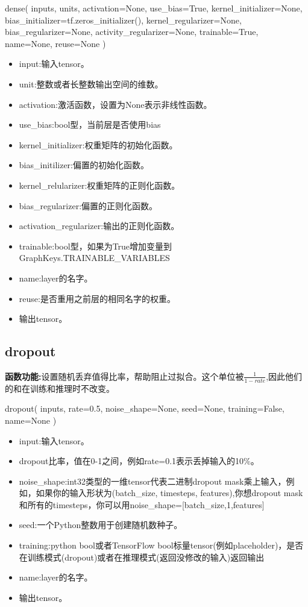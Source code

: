 \begin{python}
dense(
    inputs,
    units,
    activation=None,
    use_bias=True,
    kernel_initializer=None,
    bias_initializer=tf.zeros_initializer(),
    kernel_regularizer=None,
    bias_regularizer=None,
    activity_regularizer=None,
    trainable=True,
    name=None,
    reuse=None
)
\end{python}
\begin{itemize}
	\item input:输入tensor。
	\item unit:整数或者长整数输出空间的维数。
	\item activation:激活函数，设置为None表示非线性函数。
	\item use\_bias:bool型，当前层是否使用bias
	\item kernel\_initializer:权重矩阵的初始化函数。
	\item bias\_initilizer:偏置的初始化函数。
	\item kernel\_relularizer:权重矩阵的正则化函数。
	\item bias\_regularizer:偏置的正则化函数。
	\item activation\_regularizer:输出的正则化函数。
	\item trainable:bool型，如果为True增加变量到GraphKeys.TRAINABLE\_VARIABLES
	\item name:layer的名字。
	\item reuse:是否重用之前层的相同名字的权重。
	\item 输出tensor。
\end{itemize}
\subsection{dropout}
\textbf{函数功能:}设置随机丢弃值得比率，帮助阻止过拟合。这个单位被$\frac{1}{1-rate}$,因此他们的和在训练和推理时不改变。

\begin{python}
dropout(
    inputs,
    rate=0.5,
    noise_shape=None,
    seed=None,
    training=False,
    name=None
)
\end{python}
\begin{itemize}
	\item input:输入tensor。
	\item dropout比率，值在0-1之间，例如rate=0.1表示丢掉输入的10\%。
	\item noise\_shape:int32类型的一维tensor代表二进制dropout mask乘上输入，例如，如果你的输入形状为(batch\_size, timesteps, features),你想dropout mask和所有的timesteps，你可以用noise\_shape=[batch\_size,1,features]
	\item seed:一个Python整数用于创建随机数种子。
	\item training:python bool或者TensorFlow bool标量tensor(例如placeholder)，是否在训练模式(dropout)或者在推理模式(返回没修改的输入)返回输出
	\item name:layer的名字。
	\item 输出tensor。
\end{itemize}
